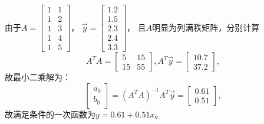 \documentclass[a4paper]{book}
\begin{document}
由于$A=\begin{bmatrix}1&1\\1&2\\1&3\\1&4\\1&5\end{bmatrix}$，
$\vec{y}=\begin{bmatrix}1.2\\1.5\\2.3\\2.4\\3.3\end{bmatrix}$，
且$A$明显为列满秩矩阵，分别计算
\begin{equation*}
A^TA=\begin{bmatrix}5&15\\15&55\end{bmatrix},
A^T\vec{y}=\begin{bmatrix}10.7\\37.2\end{bmatrix},
\end{equation*}
故最小二乘解为：
\begin{equation*}
\begin{bmatrix}a_0\\b_0\end{bmatrix}=
(A^TA)^{-1}A^T\vec{y}=\begin{bmatrix}0.61\\0.51\end{bmatrix},
\end{equation*}
故满足条件的一次函数为$y=0.61+0.51x$。
\end{document}
